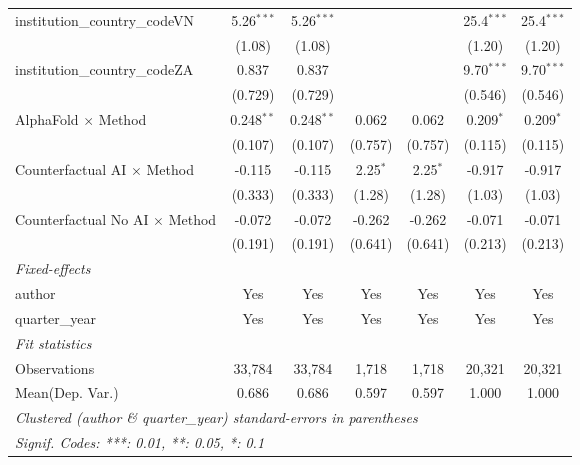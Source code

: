 \begin{tabular}{lcccccc}
   institution\_country\_codeVN          & 5.26$^{***}$   & 5.26$^{***}$   &               &               & 25.4$^{***}$  & 25.4$^{***}$\\   
                                         & (1.08)         & (1.08)         &               &               & (1.20)        & (1.20)\\   
   institution\_country\_codeZA          & 0.837          & 0.837          &               &               & 9.70$^{***}$  & 9.70$^{***}$\\   
                                         & (0.729)        & (0.729)        &               &               & (0.546)       & (0.546)\\   
   AlphaFold $\times$ Method             & 0.248$^{**}$   & 0.248$^{**}$   & 0.062         & 0.062         & 0.209$^{*}$   & 0.209$^{*}$\\   
                                         & (0.107)        & (0.107)        & (0.757)       & (0.757)       & (0.115)       & (0.115)\\   
   Counterfactual AI $\times$ Method     & -0.115         & -0.115         & 2.25$^{*}$    & 2.25$^{*}$    & -0.917        & -0.917\\   
                                         & (0.333)        & (0.333)        & (1.28)        & (1.28)        & (1.03)        & (1.03)\\   
   Counterfactual No AI $\times$ Method  & -0.072         & -0.072         & -0.262        & -0.262        & -0.071        & -0.071\\   
                                         & (0.191)        & (0.191)        & (0.641)       & (0.641)       & (0.213)       & (0.213)\\   
   \midrule
   \emph{Fixed-effects}\\
   author                                & Yes            & Yes            & Yes           & Yes           & Yes           & Yes\\  
   quarter\_year                         & Yes            & Yes            & Yes           & Yes           & Yes           & Yes\\  
   \midrule
   \emph{Fit statistics}\\
   Observations                          & 33,784         & 33,784         & 1,718         & 1,718         & 20,321        & 20,321\\  
Mean(Dep. Var.) & 0.686 & 0.686 & 0.597 & 0.597 & 1.000 & 1.000 \\
   \midrule \midrule
   \multicolumn{7}{l}{\emph{Clustered (author \& quarter\_year) standard-errors in parentheses}}\\
   \multicolumn{7}{l}{\emph{Signif. Codes: ***: 0.01, **: 0.05, *: 0.1}}\\
\end{tabular}
\par\endgroup
